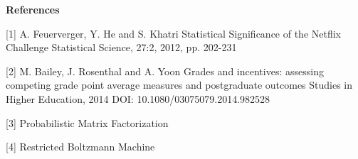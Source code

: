 \documentclass[12pt]{article}
\begin{document}
\medskip
\noindent
{\bf References}

[1] A. Feuerverger, Y. He and S. Khatri
Statistical Significance of the Netflix Challenge
Statistical Science, 27:2, 2012, pp. 202-231

[2] M. Bailey, J. Rosenthal and A. Yoon
Grades and incentives: assessing competing grade point 
average measures and postgraduate outcomes
Studies in Higher Education, 2014
DOI: 10.1080/03075079.2014.982528

[3] Probabilistic Matrix Factorization

[4] Restricted Boltzmann Machine
\end{document}
